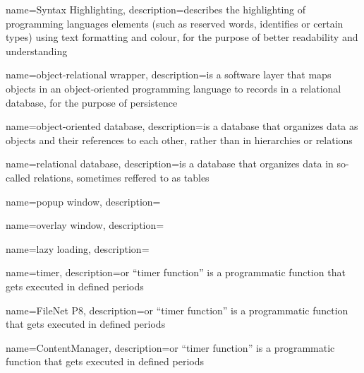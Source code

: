 
{
	name=Syntax Highlighting,
	description={describes the highlighting of programming languages elements (such as reserved words, identifies or certain types) using text formatting and colour, for the purpose of better readability and understanding}
}

{
	name=object-relational wrapper,
	description={is a software layer that maps objects in an object-oriented programming language to records in a relational database, for the purpose of persistence}
}

{
	name=object-oriented database,
	description={is a database that organizes data as objects and their references to each other, rather than in hierarchies or relations}
}

{
	name=relational database,
	description={is a database that organizes data in so-called relations, sometimes reffered to as tables}
}

{
	name=popup window,
	description={}
}

{
	name=overlay window,
	description={}
}

{
	name=lazy loading,
	description={}
}

{
	name=timer,
	description={or ``timer function'' is a programmatic function that gets executed in defined periods}
}

{
	name=FileNet P8,
	description={or ``timer function'' is a programmatic function that gets executed in defined periods}
}

{
	name=ContentManager,
	description={or ``timer function'' is a programmatic function that gets executed in defined periods}
}
